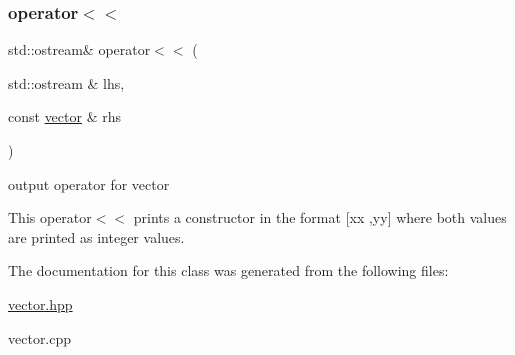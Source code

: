 \subsubsection{\texorpdfstring{operator$<$$<$}{operator<<}}
{\footnotesize\ttfamily std\+::ostream\& operator$<$$<$ (\begin{DoxyParamCaption}\item[{std\+::ostream \&}]{lhs,  }\item[{const \hyperlink{classvector}{vector} \&}]{rhs }\end{DoxyParamCaption})\hspace{0.3cm}{\ttfamily [friend]}}



output operator for vector 

This operator$<$$<$ prints a constructor in the format \mbox{[}xx ,yy\mbox{]} where both values are printed as integer values. 

The documentation for this class was generated from the following files\+:\begin{DoxyCompactItemize}
\item 
\hyperlink{vector_8hpp}{vector.\+hpp}\item 
vector.\+cpp\end{DoxyCompactItemize}
